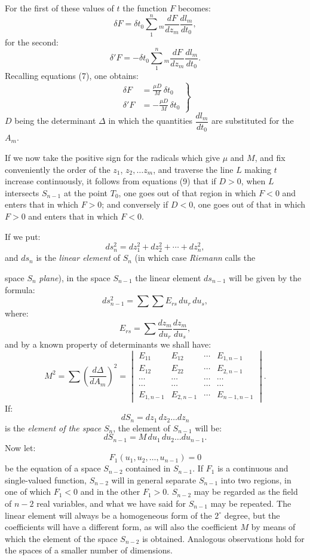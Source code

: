 \documentclass{article}
\begin{document}
For the first of these values of $t$ the function $F$ becomes:
\[ \delta F = \delta t_{0}\sum_{1}^{n}{}_{m}\frac{dF}{dz_{m}}\frac{dl_{m}}{dt_{0}}, \]
for the second:
\[ \delta' F = -\delta t_{0}\sum_{1}^{n}{}_{m}\frac{dF}{dz_{m}}\frac{dl_{m}}{dt_{0}}. \]
Recalling equations (7), one obtains:
\[
\left.
\begin{aligned}
\delta F &= \frac{\mu D}{M}\,\delta t_{0}\\[4pt]
\delta' F &= -\frac{\mu D}{M}\,\delta t_{0}
\end{aligned}
\right\}
\tag{9}
\]
$D$ being the determinant $\Delta$ in which the quantities $\dfrac{dl_{m}}{dt_{0}}$ are substituted for the $A_{m}$.

If we now take the positive sign for the radicals which give $\mu$ and $M$, and fix conveniently the order of the $z_{1}$, $z_{2},\ldots z_{m}$, and traverse the line $L$ making $t$ increase continuously, it follows from equations (9) that if $D > 0$, when $L$ intersects $S_{n-1}$ at the point $T_{0}$, one goes out of that region in which $F < 0$ and enters that in which $F > 0$; and conversely if $D < 0$, one goes out of that in which $F > 0$ and enters that in which $F < 0$.

If we put:
\[ ds_{n}^{2} = dz_{1}^{2} + dz_{2}^{2} + \cdots + dz_{n}^{2}, \]
and $ds_{n}$ is the \emph{linear element} of $S_{n}$ (in which case \emph{Riemann} calls the

space $S_{n}$ \emph{plane}), in the space $S_{n-1}$ the linear element $ds_{n-1}$ will be given by the formula:
\[ ds_{n-1}^{2} = \sum\sum E_{rs}\,du_{r}\,du_{s}, \]
where:
\[ E_{rs} = \sum \frac{dz_{m}}{du_{r}}\frac{dz_{m}}{du_{s}}, \]
and by a known property of determinants we shall have:
\[
M^{2} = \sum\left(\frac{d\Delta}{dA_{m}}\right)^{2} =
\begin{vmatrix}
E_{11} & E_{12} & \cdots & E_{1,n-1}\\
E_{12} & E_{22} & \cdots & E_{2,n-1}\\
\cdots & \cdots & \cdots & \cdots\\
\cdots & \cdots & \cdots & \cdots\\
E_{1,n-1} & E_{2,n-1} & \cdots & E_{n-1,n-1}
\end{vmatrix}.
\tag{10}
\]
If:
\[ dS_{n} = dz_{1}\,dz_{2}\ldots dz_{n} \]
is the \emph{element of the space} $S_{n}$, the element of $S_{n-1}$ will be:
\[ dS_{n-1} = M\,du_{1}\,du_{2}\ldots du_{n-1}. \tag{11} \]
Now let:
\[ F_{1}(u_{1}, u_{2},\ldots, u_{n-1}) = 0 \]
be the equation of a space $S_{n-2}$ contained in $S_{n-1}$. If $F_{1}$ is a continuous and single-valued function, $S_{n-2}$ will in general separate $S_{n-1}$ into two regions, in one of which $F_{1} < 0$ and in the other $F_{1} > 0$. $S_{n-2}$ may be regarded as the field of $n-2$ real variables, and what we have said for $S_{n-1}$ may be repeated. The linear element will always be a homogeneous form of the $2^{\circ}$ degree, but the coefficients will have a different form, as will also the coefficient $M$ by means of which the element of the space $S_{n-2}$ is obtained. Analogous observations hold for the spaces of a smaller number of dimensions.
\end{document}
